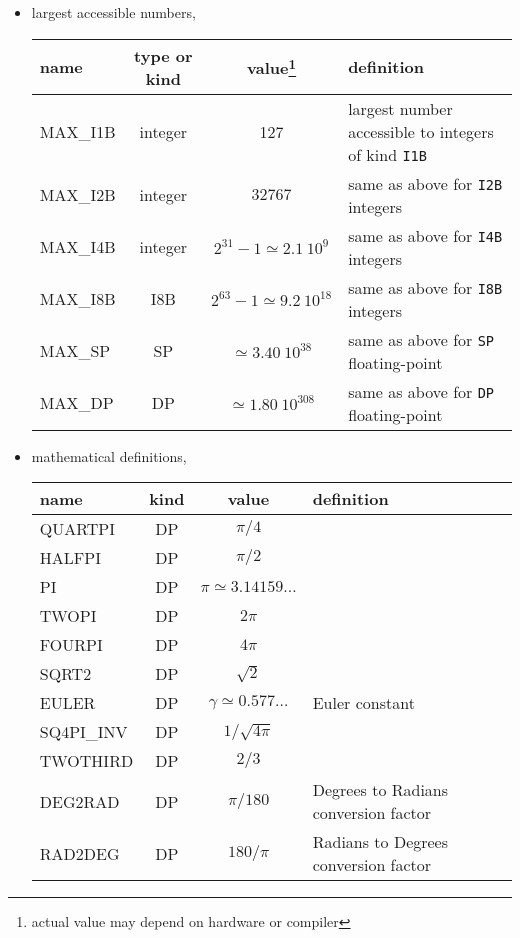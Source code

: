 \begin{itemize}
\item
largest accessible numbers, 

\begin{minipage}{\linewidth}{%
\renewcommand{\thefootnote}{\fnsymbol{footnote}}%
\renewcommand{\footnoterule}{}%
%
\begin{tabularx}{\linewidth}{lcc X}
name & type or kind & value\footnote{\label{fn:healpix_types:max}%
actual value may depend on hardware or compiler} & definition \\
\hline
MAX\_I1B & integer & 127 & largest number accessible to integers of kind {\tt I1B}\\
MAX\_I2B & integer & $32767$ &
same as above for {\tt I2B} integers\\
MAX\_I4B & integer & $2^{31}-1 \simeq 2.1\ 10^9$& same as above for {\tt I4B} integers \\
MAX\_I8B & I8B & $2^{63}-1 \simeq 9.2\ 10^{18}$& same as above for {\tt I8B} integers \\
MAX\_SP & SP & $\simeq 3.40\ 10^{38}$ & same as above for {\tt SP} floating-point\\
MAX\_DP & DP & $\simeq 1.80\ 10^{308}$ & same as above for {\tt DP} floating-point\\
\hline
\end{tabularx}
}%
\end{minipage}

\item
mathematical definitions,%
%

\begin{mytable}{%
\begin{tabularx}{\linewidth}{lcc X}
name & kind & value & definition \\
\hline
QUARTPI & DP & $\pi/4$ & \\
HALFPI & DP & $\pi/2$ & \\
PI & DP & $\pi \simeq 3.14159\ldots$ & \\
TWOPI & DP & $2\pi$ & \\
FOURPI & DP & $4\pi$ & \\
SQRT2 & DP & $\sqrt{2}$ & \\
EULER & DP & $\gamma \simeq 0.577\ldots$ & Euler constant \\
SQ4PI\_INV & DP & $1/\sqrt{4\pi}$ & \\
TWOTHIRD & DP & $2/3$ & \\
DEG2RAD & DP & $\pi/180$ & Degrees to Radians conversion factor\\
RAD2DEG & DP & $180/\pi$ & Radians to Degrees conversion factor\\
\hline
\end{tabularx}
}
\end{mytable}


\end{itemize}
